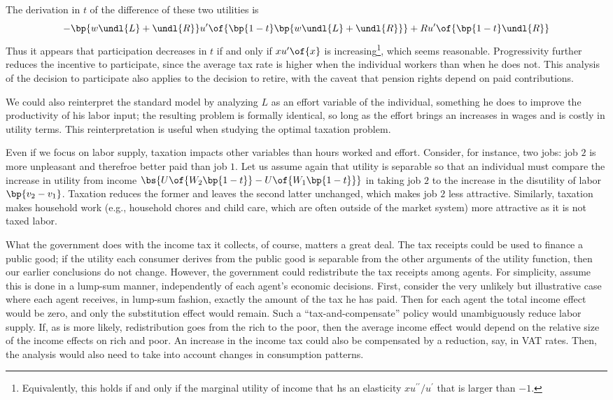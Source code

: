 The derivation in $t$ of the difference of these two utilities is 
\begin{equation}
    \notag 
    -\bp{w\undl{L} + \undl{R}} u^{\prime}\of{\bp{1-t} \bp{w\undl{L} + \undl{R}}} + Ru^{\prime}\of{\bp{1-t}\undl{R}}
\end{equation}
Thus it appears that participation decreases in $t$ if and only if $x u^{\prime}\of{x}$ is increasing\footnote{Equivalently, this holds if and only if the marginal utility of income that hs an elasticity $x u^{\prime\prime} / u^{\prime}$ that is larger than $-1$.}, which seems reasonable. Progressivity further reduces the incentive to participate, since the average tax rate is higher when the individual workers than when he does not. This analysis of the decision to participate also applies to the decision to retire, with the caveat that pension rights depend on paid contributions.

We could also reinterpret the standard model by analyzing $L$ as an effort variable of the individual, something he does to improve the productivity of his labor input; the resulting problem is formally identical, so long as the effort brings an increases in wages and is costly in utility terms. This reinterpretation is useful when studying the optimal taxation problem.

Even if we focus on labor supply, taxation impacts other variables than hours worked and effort. Consider, for instance, two jobs: job $2$ is more unpleasant and therefroe better paid than job $1$. Let us assume again that utility is separable so that an individual must compare the increase in utility from income $\bs{U\of{W_2\bp{1-t}} - U\of{W_1\bp{1-t}}}$ in taking job $2$ to the increase in the disutility of labor $\bp{v_2 - v_1}$. Taxation reduces the former and leaves the second latter unchanged, which makes job $2$ less attractive. Similarly, taxation makes household work (e.g., household chores and child care, which are often outside of the market system) more attractive as it is not taxed labor.

What the government does with the income tax it collects, of course, matters a great deal. The tax receipts could be used to finance a public good; if the utility each consumer derives from the public good is separable from the other arguments of the utility function, then our earlier conclusions do not change. However, the government could redistribute the tax receipts among agents. For simplicity, assume this is done in a lump-sum manner, independently of each agent's economic decisions. First, consider the very unlikely but illustrative case where each agent receives, in lump-sum fashion, exactly the amount of the tax he has paid. Then for each agent the total income effect would be zero, and only the substitution effect would remain. Such a ``tax-and-compensate'' policy would unambiguously reduce labor supply. If, as is more likely, redistribution goes from the rich to the poor, then the average income effect would depend on the relative size of the income effects on rich and poor. An increase in the income tax could also be compensated by a reduction, say, in VAT rates. Then, the analysis would also need to take into account changes in consumption patterns.


